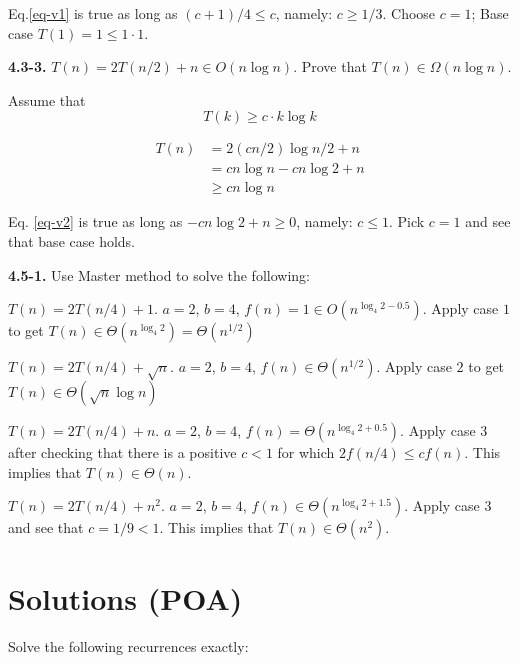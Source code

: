 \documentclass[11pt,a4paper]{article}
\renewcommand{\leq}{\leqslant}
\renewcommand{\geq}{\geqslant}
\begin{document}
Eq.\ref{eq-v1} is true as long as $(c+1)/4 \leq c$, namely: $c \geq 1/3$. Choose $c=1$; Base case $T(1) = 1 \leq 1 \cdot 1$.


\noindent\textbf{4.3-3.} $T(n) = 2T(n / 2) + n \in O(n \log{n})$. Prove that $T(n) \in \Omega(n \log{n})$.

Assume that
\begin{equation}
\label{eq-third}
T(k) \geq c \cdot k \log{k}
\end{equation}

\begin{equation}
\label{eq-v2}
\begin{split}
	T(n)&= 2 (cn/2) \log{n/2} + n \\
		&= cn\log{n} - cn\log{2} + n \\
		& \geq cn\log{n}
\end{split}
\end{equation}

Eq. \ref{eq-v2} is true as long as $-cn \log 2 + n \geq 0$, namely: $c \leq 1$. Pick $c = 1$ and see that base case holds.


\noindent\textbf{4.5-1.} Use Master method to solve the following:

\begin{description} \itemsep8pt
	\item $T(n) = 2T(n/4) + 1$. $a = 2$, $b=4$, $f(n) = 1 \in O(n^{\log_4 2 - 0.5})$. Apply case $1$ to get $T(n) \in \Theta(n^{\log_4{2}}) = \Theta(n^{1/2})$

	\item $T(n) = 2T(n/4) + \sqrt{n}$. $a=2$, $b=4$, $f(n) \in \Theta(n^{1/2})$. Apply case $2$ to get $T(n) \in \Theta(\sqrt{n}\log{n})$

	\item $T(n) = 2T(n/4) + n$. $a = 2$, $b=4$, $f(n) = \Theta(n^{\log_4 2 + 0.5})$. Apply case $3$ after checking that there is a positive $c < 1$ for which $2f(n/4) \leq cf(n)$. This implies that $T(n) \in \Theta(n)$.

	\item $T(n) = 2T(n/4) + n^2$. $a=2$, $b=4$, $f(n) \in \Theta(n^{\log_4 2 + 1.5})$. Apply case $3$ and see that $c=1/9 < 1$. This implies that $T(n) \in \Theta(n^2)$.

\end{description}


\section*{Solutions (POA)}
Solve the following recurrences exactly:
\end{document}

